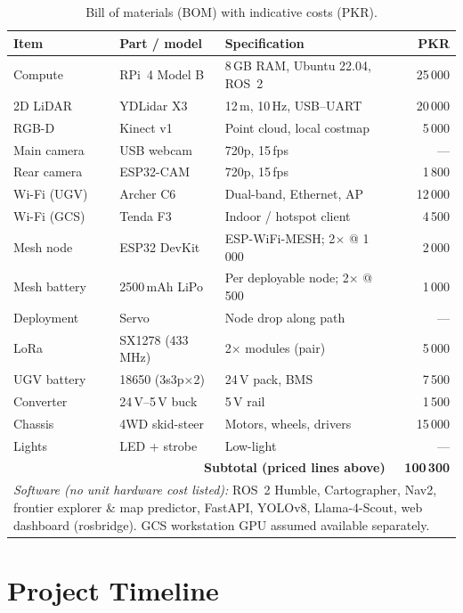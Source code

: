\begin{table}[htbp]
\caption{Bill of materials (BOM) with indicative costs (PKR).}
\label{tab:bom}
\centering
\small
\begin{tabular}{p{1.7cm}p{2.1cm}p{3.2cm}r}
\toprule
\textbf{Item} & \textbf{Part / model} & \textbf{Specification} & \textbf{PKR} \\
\midrule
Compute & RPi~4 Model B & 8\,GB RAM, Ubuntu 22.04, ROS~2 & 25\,000 \\
2D LiDAR & YDLidar X3 & 12\,m, 10\,Hz, USB--UART & 20\,000 \\
RGB-D & Kinect v1 & Point cloud, local costmap & 5\,000 \\
Main camera & USB webcam & 720p, 15\,fps & --- \\
Rear camera & ESP32-CAM & 720p, 15\,fps & 1\,800 \\
Wi-Fi (UGV) & Archer C6 & Dual-band, Ethernet, AP & 12\,000 \\
Wi-Fi (GCS) & Tenda F3 & Indoor / hotspot client & 4\,500 \\
Mesh node & ESP32 DevKit & ESP-WiFi-MESH; 2$\times$ @ 1\,000 & 2\,000 \\
Mesh battery & 2500\,mAh LiPo & Per deployable node; 2$\times$ @ 500 & 1\,000 \\
Deployment & Servo & Node drop along path & --- \\
LoRa & SX1278 (433\,MHz) & 2$\times$ modules (pair) & 5\,000 \\
UGV battery & 18650 (3s3p$\times$2) & 24\,V pack, BMS & 7\,500 \\
Converter & 24\,V--5\,V buck & 5\,V rail & 1\,500 \\
Chassis & 4WD skid-steer & Motors, wheels, drivers & 15\,000 \\
Lights & LED + strobe & Low-light & --- \\
\midrule
\multicolumn{3}{r}{\textbf{Subtotal (priced lines above)}} & \textbf{100\,300} \\
\midrule
\multicolumn{4}{p{10.8cm}}{\textit{Software (no unit hardware cost listed):} ROS~2 Humble, Cartographer, Nav2, frontier explorer \& map predictor, FastAPI, YOLOv8, Llama-4-Scout, web dashboard (rosbridge). GCS workstation GPU assumed available separately.} \\
\bottomrule
\end{tabular}
\end{table}

\chapter{Project Timeline}
\label{app:timeline}

